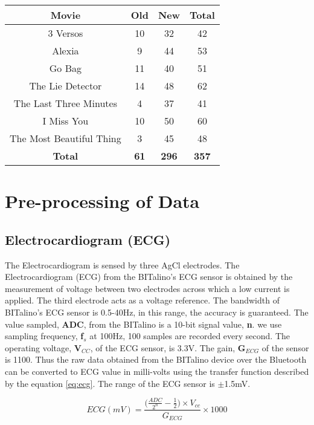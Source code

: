 \begin{center}
\begin{tabular}{ |c|c|c|c| }
\hline
Movie & Old & New & Total \\
\hline
\hline
3 Versos & 10 & 32 & 42 \\
\hline
Alexia & 9 & 44 & 53 \\
\hline
Go Bag & 11 & 40 & 51 \\
\hline
The Lie Detector & 14 & 48 & 62 \\
\hline
The Last Three Minutes & 4 & 37 & 41 \\
\hline
I Miss You & 10 & 50 & 60 \\
\hline
The Most Beautiful Thing & 3 & 45 & 48 \\
\hline
\textbf{Total} & \textbf{61} & \textbf{296} & \textbf{357} \\
\hline
\end{tabular}
\label{tab:eda_data_set}
\end{center}

\section{Pre-processing of Data}
\label{sec:preprocessing}
\subsection{Electrocardiogram (ECG)}
\label{sec:ecg_feature_extraction}
The Electrocardiogram is sensed by three AgCl electrodes. The Electrocardiogram (ECG) from the BITalino's ECG sensor is obtained by the measurement of voltage between two electrodes across which a low current is applied. The third electrode acts as a voltage reference. The bandwidth of BITalino's ECG sensor is 0.5-40Hz, in this range, the accuracy is guaranteed. The value sampled, \textbf{ADC}, from the BITalino is a 10-bit signal value, \textbf{n}. we use sampling frequency, \textbf{f$_{s}$} at 100Hz, 100 samples are recorded every second. The operating voltage, \textbf{V$_{CC}$}, of the ECG sensor, is 3.3V. The gain, \textbf{G$_{ECG}$} of the sensor is 1100. Thus the raw data obtained from the BITalino device over the Bluetooth can be converted to ECG value in milli-volts using the transfer function described by the equation \ref{eq:ecg}. The range of the ECG sensor is $\pm$1.5mV.

\begin{equation}
\label{eq:ecg}
    ECG(mV) = \frac{\big(\frac{ADC}{2^n} - \frac{1}{2})\times V_{cc}} {G_{ECG}}\times1000
\end{equation}


